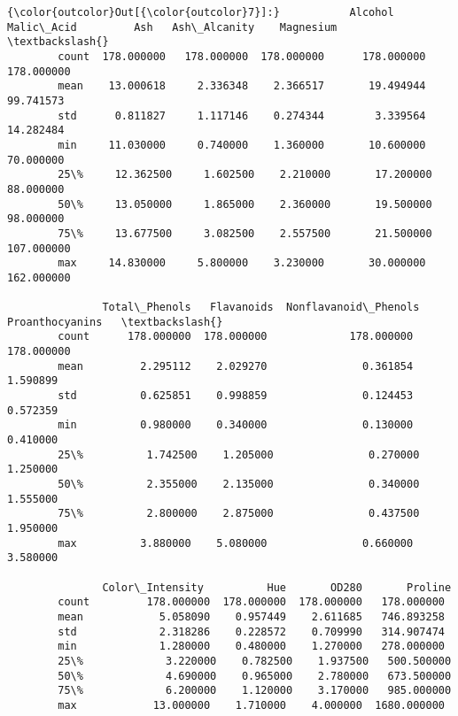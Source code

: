 \documentclass[11pt]{article}
\begin{document}
\begin{Verbatim}[commandchars=\\\{\}]
{\color{outcolor}Out[{\color{outcolor}7}]:}           Alcohol  Malic\_Acid         Ash   Ash\_Alcanity    Magnesium   \textbackslash{}
        count  178.000000   178.000000  178.000000      178.000000  178.000000   
        mean    13.000618     2.336348    2.366517       19.494944   99.741573   
        std      0.811827     1.117146    0.274344        3.339564   14.282484   
        min     11.030000     0.740000    1.360000       10.600000   70.000000   
        25\%     12.362500     1.602500    2.210000       17.200000   88.000000   
        50\%     13.050000     1.865000    2.360000       19.500000   98.000000   
        75\%     13.677500     3.082500    2.557500       21.500000  107.000000   
        max     14.830000     5.800000    3.230000       30.000000  162.000000   
        
               Total\_Phenols   Flavanoids  Nonflavanoid\_Phenols   Proanthocyanins   \textbackslash{}
        count      178.000000  178.000000             178.000000        178.000000   
        mean         2.295112    2.029270               0.361854          1.590899   
        std          0.625851    0.998859               0.124453          0.572359   
        min          0.980000    0.340000               0.130000          0.410000   
        25\%          1.742500    1.205000               0.270000          1.250000   
        50\%          2.355000    2.135000               0.340000          1.555000   
        75\%          2.800000    2.875000               0.437500          1.950000   
        max          3.880000    5.080000               0.660000          3.580000   
        
               Color\_Intensity          Hue       OD280       Proline  
        count         178.000000  178.000000  178.000000   178.000000  
        mean            5.058090    0.957449    2.611685   746.893258  
        std             2.318286    0.228572    0.709990   314.907474  
        min             1.280000    0.480000    1.270000   278.000000  
        25\%             3.220000    0.782500    1.937500   500.500000  
        50\%             4.690000    0.965000    2.780000   673.500000  
        75\%             6.200000    1.120000    3.170000   985.000000  
        max            13.000000    1.710000    4.000000  1680.000000  
\end{Verbatim}
            
\end{document}

